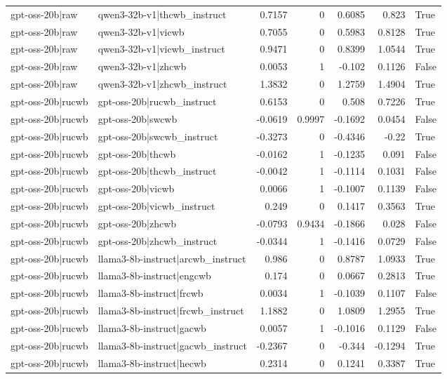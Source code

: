 \begin{table}
\begin{tabular}{l l r r r r l}
gpt-oss-20b|raw & qwen3-32b-v1|thcwb_instruct & 0.7157 & 0 & 0.6085 & 0.823 & True \\
gpt-oss-20b|raw & qwen3-32b-v1|vicwb & 0.7055 & 0 & 0.5983 & 0.8128 & True \\
gpt-oss-20b|raw & qwen3-32b-v1|vicwb_instruct & 0.9471 & 0 & 0.8399 & 1.0544 & True \\
gpt-oss-20b|raw & qwen3-32b-v1|zhcwb & 0.0053 & 1 & -0.102 & 0.1126 & False \\
gpt-oss-20b|raw & qwen3-32b-v1|zhcwb_instruct & 1.3832 & 0 & 1.2759 & 1.4904 & True \\
gpt-oss-20b|rucwb & gpt-oss-20b|rucwb_instruct & 0.6153 & 0 & 0.508 & 0.7226 & True \\
gpt-oss-20b|rucwb & gpt-oss-20b|swcwb & -0.0619 & 0.9997 & -0.1692 & 0.0454 & False \\
gpt-oss-20b|rucwb & gpt-oss-20b|swcwb_instruct & -0.3273 & 0 & -0.4346 & -0.22 & True \\
gpt-oss-20b|rucwb & gpt-oss-20b|thcwb & -0.0162 & 1 & -0.1235 & 0.091 & False \\
gpt-oss-20b|rucwb & gpt-oss-20b|thcwb_instruct & -0.0042 & 1 & -0.1114 & 0.1031 & False \\
gpt-oss-20b|rucwb & gpt-oss-20b|vicwb & 0.0066 & 1 & -0.1007 & 0.1139 & False \\
gpt-oss-20b|rucwb & gpt-oss-20b|vicwb_instruct & 0.249 & 0 & 0.1417 & 0.3563 & True \\
gpt-oss-20b|rucwb & gpt-oss-20b|zhcwb & -0.0793 & 0.9434 & -0.1866 & 0.028 & False \\
gpt-oss-20b|rucwb & gpt-oss-20b|zhcwb_instruct & -0.0344 & 1 & -0.1416 & 0.0729 & False \\
gpt-oss-20b|rucwb & llama3-8b-instruct|arcwb_instruct & 0.986 & 0 & 0.8787 & 1.0933 & True \\
gpt-oss-20b|rucwb & llama3-8b-instruct|engcwb & 0.174 & 0 & 0.0667 & 0.2813 & True \\
gpt-oss-20b|rucwb & llama3-8b-instruct|frcwb & 0.0034 & 1 & -0.1039 & 0.1107 & False \\
gpt-oss-20b|rucwb & llama3-8b-instruct|frcwb_instruct & 1.1882 & 0 & 1.0809 & 1.2955 & True \\
gpt-oss-20b|rucwb & llama3-8b-instruct|gacwb & 0.0057 & 1 & -0.1016 & 0.1129 & False \\
gpt-oss-20b|rucwb & llama3-8b-instruct|gacwb_instruct & -0.2367 & 0 & -0.344 & -0.1294 & True \\
gpt-oss-20b|rucwb & llama3-8b-instruct|hecwb & 0.2314 & 0 & 0.1241 & 0.3387 & True \\

\end{tabular}
\end{table}
